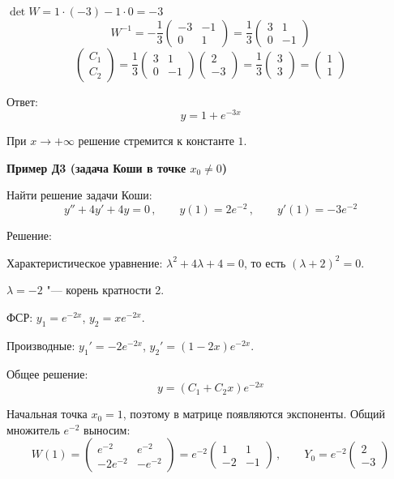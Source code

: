 \documentclass[11pt,a4paper]{article}
\newcommand{\example}[1]{\par\medskip\noindent\textbf{#1}\par\nopagebreak\smallskip}
\begin{document}
$\det W = 1 \cdot (-3) - 1 \cdot 0 = -3$
\[
  W^{-1} = -\frac13 \begin{pmatrix} -3 & -1 \\ 0 & 1 \end{pmatrix}
  = \frac13 \begin{pmatrix} 3 & 1 \\ 0 & -1 \end{pmatrix}
\]
\[
  \begin{pmatrix} C_1 \\ C_2 \end{pmatrix}
  = \frac13 \begin{pmatrix} 3 & 1 \\ 0 & -1 \end{pmatrix} \begin{pmatrix} 2 \\ -3 \end{pmatrix}
  = \frac13 \begin{pmatrix} 3 \\ 3 \end{pmatrix}
  = \begin{pmatrix} 1 \\ 1 \end{pmatrix}
\]

Ответ:
\[
  y = 1 + e^{-3x}
\]

При $x \to +\infty$ решение стремится к константе $1$.

\example{Пример Д3 (задача Коши в точке $x_0 \ne 0$)}

Найти решение задачи Коши:
\[
  y'' + 4y' + 4y = 0\,, \qquad y(1) = 2e^{-2}\,, \qquad y'(1) = -3e^{-2}
\]

Решение:

Характеристическое уравнение: $\lambda^2 + 4\lambda + 4 = 0$, то есть $(\lambda + 2)^2 = 0$.

$\lambda = -2$ "--- корень кратности 2.

ФСР: $y_1 = e^{-2x}$, $y_2 = x e^{-2x}$.

Производные: $y_1' = -2e^{-2x}$, $y_2' = (1 - 2x)e^{-2x}$.

Общее решение:
\[
  y = (C_1 + C_2 x)e^{-2x}
\]

Начальная точка $x_0 = 1$, поэтому в матрице появляются экспоненты. Общий множитель $e^{-2}$ выносим:
\[
  W(1) = \begin{pmatrix} e^{-2} & e^{-2} \\ -2e^{-2} & -e^{-2} \end{pmatrix}
  = e^{-2} \begin{pmatrix} 1 & 1 \\ -2 & -1 \end{pmatrix}\,,
  \qquad
  Y_0 = e^{-2} \begin{pmatrix} 2 \\ -3 \end{pmatrix}
\]
\end{document}
